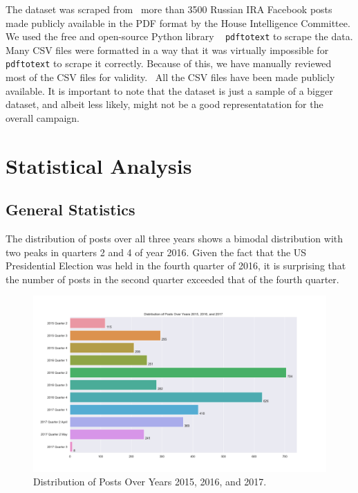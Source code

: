 \documentclass[12pt]{article}
\theoremstyle{definition}
\begin{document}
The dataset was scraped from~\cite{ira2016data} more than 3500 Russian IRA
Facebook posts made publicly available in the PDF format by the House
Intelligence Committee. We used the free and open-source Python library
~\cite{pdftotext} \texttt{pdftotext} to scrape the data. Many CSV files were
formatted in a way that it was virtually impossible for \texttt{pdftotext} to
scrape it correctly. Because of this, we have manually reviewed most of the
CSV files for validity.~\cite{ira2016csvdata} All the CSV files have been made
publicly available. It is important to note that the dataset is just a sample
of a bigger dataset, and albeit less likely, might not be a good representatation
for the overall campaign.


\section*{\centering Statistical Analysis}


\subsection*{\centering General Statistics}
The distribution of posts over all three years shows a bimodal distribution
with two peaks in quarters 2 and 4 of year 2016. Given the fact that the US
Presidential Election was held in the fourth quarter of 2016, it is surprising
that the number of posts in the second quarter exceeded that of the fourth
quarter.

\begin{figure}[H]
\centering
\includegraphics[width=0.75\columnwidth]{./image/barchart-plots/barchart_distribution_of_posts.png}
\caption*{Distribution of Posts Over Years 2015, 2016, and 2017.}
\end{figure}
\end{document}
